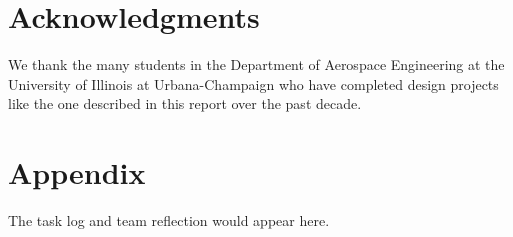 \documentclass[conf]{new-aiaa}
\begin{document}
\section*{Acknowledgments}

We thank the many students in the Department of Aerospace Engineering at the University of Illinois at Urbana-Champaign who have completed design projects like the one described in this report over the past decade.



\section*{Appendix}

The task log and team reflection would appear here.
\end{document}
